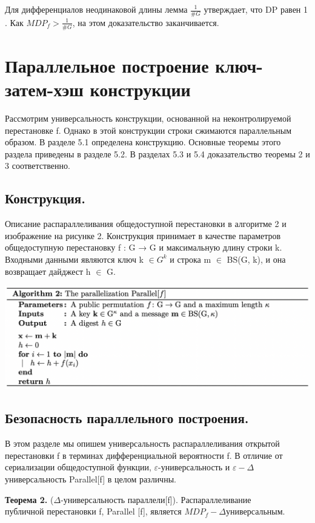 \documentclass[utf8,14pt,a4paper,oneside,russian]{book}
\begin{document}
 Для дифференциалов неодинаковой длины лемма $\frac {1}{\#G}$ утверждает, 
 что DP равен 1 . Как $MDP_f > \frac {1}{\#G}$, на этом доказательство заканчивается.
 
 \section{Параллельное построение ключ-затем-хэш конструкции}

Рассмотрим универсальность конструкции, основанной на неконтролируемой 
перестановке f. Однако в этой конструкции строки сжимаются параллельным 
образом. В разделе 5.1 определена конструкцию. Основные теоремы этого 
раздела приведены в разделе 5.2. В разделах 5.3 и 5.4 доказательство 
теоремы 2 и 3 соответственно.

\subsection{Конструкция.}

Описание распараллеливания общедоступной перестановки в алгоритме 2 
и изображение на рисунке 2. Конструкция принимает в качестве параметров 
общедоступную перестановку f : G → G и максимальную длину строки k. 
Входными данными являются ключ k $\in G^k$ и строка m $\in$ BS(G, k), 
и она возвращает дайджест h $\in$ G.

\includegraphics[width=15cm]{form14}

\subsection{Безопасность параллельного построения.}

В этом разделе мы опишем универсальность распараллеливания открытой 
перестановки f в терминах дифференциальной вероятности f. В отличие от 
сериализации общедоступной функции, $\varepsilon$-универсальность и 
$\varepsilon-\Delta $ универсальность Parallel[f] в целом различны.

\textbf{Теорема 2.} ($\Delta$-универсальность параллели[f]). Распараллеливание \\
публичной перестановки f, Parallel [f], является $MDP_f-\Delta$универсальным.
\end{document}
